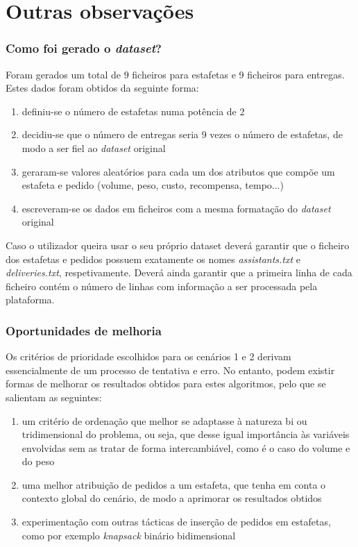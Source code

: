 \documentclass{beamer}
\begin{document}







\section{Outras observações}

\begin{frame}
\frametitle{Como foi gerado o \textit{dataset}?}
Foram gerados um total de 9 ficheiros para estafetas e 9 ficheiros para entregas.
Estes dados foram obtidos da seguinte forma:

\begin{enumerate}
  \item definiu-se o número de estafetas numa potência de 2
  \item decidiu-se que o número de entregas seria 9 vezes o número de estafetas, de modo a ser fiel ao \textit{dataset} original
  \item geraram-se valores aleatórios para cada um dos atributos que compõe um estafeta e pedido (volume, peso, custo, recompensa, tempo...)
  \item escreveram-se os dados em ficheiros com a mesma formatação do \textit{dataset} original
\end{enumerate}

Caso o utilizador queira usar o seu próprio dataset deverá garantir que o ficheiro dos estafetas e pedidos
possuem exatamente os nomes \textit{assistants.txt} e \textit{deliveries.txt}, respetivamente.
Deverá ainda garantir que a primeira linha de cada ficheiro contém o número de linhas com informação a ser processada pela plataforma.

\end{frame}

\begin{frame}
\frametitle{Oportunidades de melhoria}
Os critérios de prioridade escolhidos para os cenários 1 e 2 derivam essencialmente de um processo de tentativa e erro.
No entanto, podem existir formas de melhorar os resultados obtidos para estes algoritmos, pelo que se salientam as seguintes:
\begin{enumerate}
  \item um critério de ordenação que melhor se adaptasse à natureza bi ou tridimensional do problema, ou seja, que desse igual importância às variáveis envolvidas sem as tratar de forma intercambiável, como é o caso do volume e do peso
  \item uma melhor atribuição de pedidos a um estafeta, que tenha em conta o contexto global do cenário, de modo a aprimorar os resultados obtidos
  \item experimentação com outras tácticas de inserção de pedidos em estafetas, como por exemplo \textit{knapsack} binário bidimensional
\end{enumerate}
\end{frame}
\end{document}
